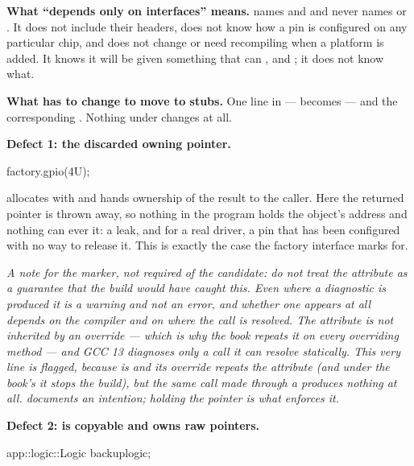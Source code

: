 \textbf{What ``depends only on interfaces'' means.}  names
 and  and never names 
or . It does not include their headers, does not know how a pin is configured on any
particular chip, and does not change or need recompiling when a platform is added. It knows it will
be given something that can ,  and ; it does not know what.

\textbf{What has to change to move to stubs.} One line in  ---
 becomes  --- and
the corresponding . Nothing under  changes at all. 

\textbf{Defect 1: the discarded owning pointer.} 

\begin{cppcode}
factory.gpio(4U);
\end{cppcode}

\noindent{} allocates with  and hands ownership of the result to the caller.
Here the returned pointer is thrown away, so nothing in the program holds the object's address and
nothing can ever  it: a leak, and for a real driver, a pin that has been configured with
no way to release it. This is exactly the case the factory interface marks 
\code{[[nodiscard]]} for.

\textit{A note for the marker, not required of the candidate: do not treat the attribute as a
guarantee that the build would have caught this. Even where a diagnostic is produced it is a warning
and not an error, and whether one appears at all depends on the compiler and on where the call is
resolved. The attribute is not inherited by an override --- which is why the book repeats it on
every overriding method --- and GCC 13 diagnoses only a call it can resolve statically. This very
line is flagged, because  is  and its override repeats the attribute (and
under the book's  it stops the build), but the same call made through a
 produces nothing at all. \code{[[nodiscard]]} documents an
intention; holding the pointer is what enforces it.}

\textbf{Defect 2:  is copyable and owns raw pointers.} 

\begin{cppcode}
app::logic::Logic backup{logic};
\end{cppcode}

